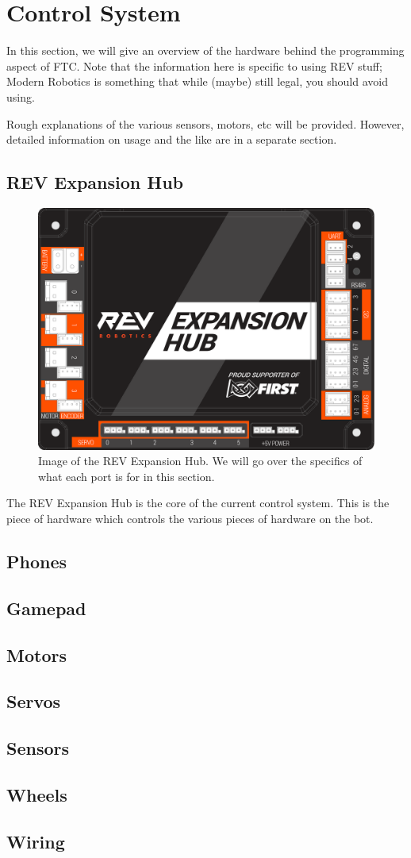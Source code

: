 \documentclass[../main.tex]{subfiles}
\begin{document}
\newpage
\section{Control System}
In this section, we will give an overview of the hardware behind the programming aspect of FTC. Note that the information here is specific to using REV stuff; Modern Robotics is something that while (maybe) still legal, you should avoid using.

Rough explanations of the various sensors, motors, etc will be provided. However, detailed information on usage and the like are in a separate section.
\subsection{REV Expansion Hub}
\begin{figure}[H]
    \includegraphics{sections/controlSystem/images/expansion_hub_four.png}
    \caption{Image of the REV Expansion Hub. We will go over the specifics of what each port is for in this section.}
\end{figure}
The REV Expansion Hub is the core of the current control system. This is the piece of hardware which controls the various pieces of hardware on the bot. 
\subsection{Phones}
\subsection{Gamepad}
\subsection{Motors}
\subsection{Servos}
\subsection{Sensors}
\subsection{Wheels}
\subsection{Wiring}
\end{document}
